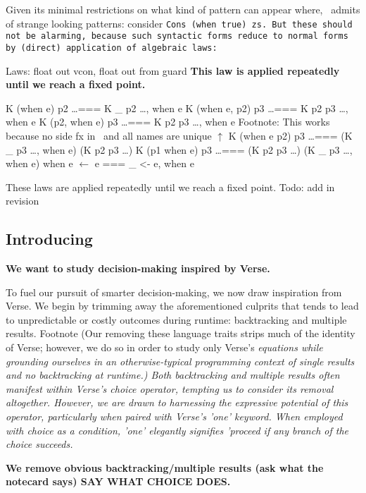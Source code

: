\documentclass[manuscript,screen,review, 12pt]{acmart}
\begin{document}
\begin{outline}[enumerate]
    Given its minimal restrictions on what kind of pattern can appear where,
    \PPlus\ admits of strange looking patterns: consider \tt{Cons (when true)
    zs}. But these should not be alarming, because such syntactic forms reduce
    to normal forms by (direct) application of algebraic laws: 

    
        \3 Laws: float out vcon, float out from guard
        \3 \bf{This law is applied repeatedly until we reach a fixed point.}

        \3 K (when e) p2 \dots === K \_ p2 \dots, when e
        \3 K (when e, p2) p3 \dots  === K p2 p3 \dots, when e
        \3 K (p2, when e) p3 \dots  === K p2 p3 \dots, when e
        \3 Footnote: This works because no side fx in \PPlus\ and all names are unique $\uparrow$ 
        \3 K (when e \pbar p2) p3 \dots === (K \_ p3 \dots, when e) \pbar (K p2 p3 \dots)
        \3 K (p1 \pbar when e) p3 \dots === (K p2 p3 \dots) \pbar (K \_ p3 \dots, when e) 
        \3 when e $\leftarrow$ e === \_ <- e, when e

        
        These laws are applied repeatedly until we reach a fixed point. 
        Todo: add in revision 
\subsection{Introducing \VMinus\ }
\1 \bf{We want to study decision-making inspired by Verse.}
        
        To fuel our pursuit of smarter decision-making, we now draw inspiration
        from Verse. We begin by trimming away the aforementioned culprits that
        tends to lead to unpredictable or costly outcomes during runtime:
        backtracking and multiple results. Footnote (Our removing these language
        traits strips much of the identity of Verse; however, we do so in order
        to study only Verse's \it{equations} while grounding ourselves in an
        otherwise-typical programming context of single results and no
        backtracking at runtime.) Both backtracking and multiple results often
        manifest within Verse's choice operator, tempting us to consider its
        removal altogether. However, we are drawn to harnessing the expressive
        potential of this operator, particularly when paired with Verse's 'one'
        keyword. When employed with choice as a condition, 'one' elegantly
        signifies 'proceed if any branch of the choice succeeds. 
        
        \2 \bf{We remove obvious backtracking/multiple results (ask what the notecard says)}
        SAY WHAT CHOICE DOES. 


\end{outline}
\end{document}
